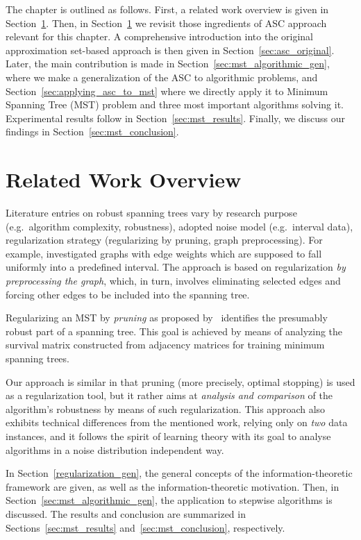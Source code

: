 The chapter is outlined as follows. First, a related work overview is given in
Section~\ref{sec:mst_related_work}. Then, in Section~\ref{sec:mst_related_work}
we revisit those ingredients of ASC approach relevant for this chapter. A
comprehensive introduction into the original approximation set-based approach is
then given in Section~\ref{sec:asc_original}. Later, the main contribution is
made in Section~\ref{sec:mst_algorithmic_gen}, where we make a generalization of
the ASC to algorithmic problems, and Section~\ref{sec:applying_asc_to_mst} where
we directly apply it to Minimum Spanning Tree (MST) problem and three most
important algorithms solving it. Experimental results follow in
Section~\ref{sec:mst_results}. Finally, we discuss our findings in
Section~\ref{sec:mst_conclusion}.

\section{Related Work Overview} 
\label{sec:mst_related_work}

Literature entries on robust spanning trees vary by research purpose
(e.g.~algorithm complexity, robustness), adopted noise model
(e.g.~interval data), regularization strategy (regularizing by
pruning, graph preprocessing).  For example,
\citep{Yaman:Karasan:Pinar:2001} investigated graphs with edge weights
which are supposed to fall uniformly into a predefined interval. The
approach is based on regularization \emph{by preprocessing the graph},
which, in turn, involves eliminating selected edges and forcing other
edges to be included into the spanning tree.

Regularizing an MST by \emph{pruning} as proposed
by~\citep{Sandoval:2012} identifies the presumably robust part of a
spanning tree. This goal is achieved by means of analyzing the
survival matrix constructed from adjacency matrices for training
minimum spanning trees.

Our approach is similar in that pruning (more precisely, optimal
stopping) is used as a regularization tool, but it rather aims at
\emph{analysis and comparison} of the algorithm's robustness by means
of such regularization. This approach also exhibits technical
differences from the mentioned work, relying only on \emph{two} data
instances, and it follows the spirit of learning theory with its goal
to analyse algorithms in a noise distribution independent way.

In Section~\ref{regularization_gen}, the general concepts of the
information-theoretic framework are given, as well as the
information-theoretic motivation. Then, in
Section~\ref{sec:mst_algorithmic_gen}, the application to stepwise algorithms
is discussed. The results and conclusion are summarized in
Sections~\ref{sec:mst_results} and~\ref{sec:mst_conclusion}, respectively.

